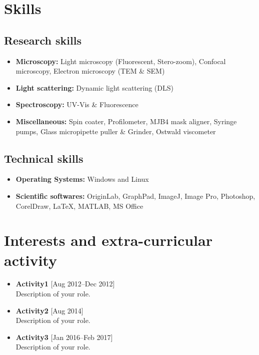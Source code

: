 \documentclass[11pt,a4paper]{moderncv}
\begin{document}
\section{Skills}
\subsection{\textbf{Research skills}}

\begin{itemize}
	
	\item \textbf{Microscopy:} Light microscopy (Fluorescent, Stero-zoom), Confocal microscopy, Electron microscopy (TEM \& SEM)
	
	\item \textbf{Light scattering:} Dynamic light scattering (DLS)
	
	\item \textbf{Spectroscopy:} UV-Vis \& Fluorescence
	
	\item \textbf{Miscellaneous:} Spin coater, Profilometer, MJB4 mask aligner, Syringe pumps, Glass micropipette puller \& Grinder, Ostwald viscometer
	
\end{itemize}
	
\subsection{\textbf{Technical skills}}
\begin{itemize}
	
	\item \textbf{Operating Systems:} Windows and Linux
	
	\item \textbf{Scientific softwares:} OriginLab, GraphPad, ImageJ, Image Pro, Photoshop, CorelDraw, \LaTeX, MATLAB, MS Office  
	
\end{itemize}
	
\section{Interests and extra-curricular activity}

\begin{itemize}
	
	\item \textbf{Activity1} \hfill [Aug 2012--Dec 2012] \\
	 Description of your role.
	
	\item \textbf{Activity2} \hfill [Aug 2014] \\
	Description of your role.
	
	\item \textbf{Activity3} \hfill [Jan 2016--Feb 2017] \\
	Description of your role.
	
\end{itemize}
\end{document}
